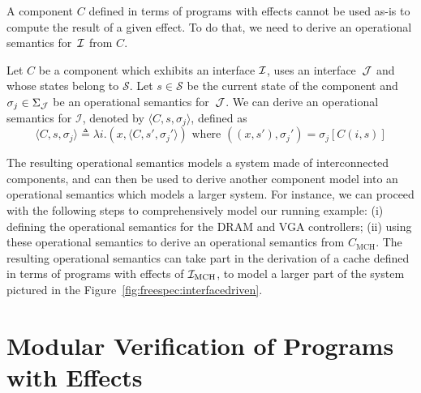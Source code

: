 A component $C$ defined in terms of programs with effects cannot be used as-is
to compute the result of a given effect.
%
To do that, we need to derive an operational semantics for~$\mathcal{I}$ from $C$.

\begin{definition} \label{def:freespec:derivation} Let $C$ be a component which
  exhibits an interface $\mathcal{I}$, uses an interface~$\mathcal{J}$ and whose states belong to
  $\mathcal{S}$.
  Let $s \in \mathcal{S}$ be the current state of the component and
  $\sigma_j \in \Sigma_{\mathcal{J}}$ be an operational semantics for~$\mathcal{J}$.
  We can derive an operational semantics for $\mathcal{I}$, denoted by
  $\langle C, s, \sigma_j \rangle$, defined as
  \[ \langle C, s, \sigma_j \rangle \triangleq \lambda i. (x, \langle C, s',
    \sigma_j' \rangle) \text{ where } ((x, s'), \sigma_j') = \sigma_j[C (i, s)]
  \]
\end{definition}


%
The resulting operational semantics models a system made of interconnected
components, and can then be used to derive another component model into an
operational semantics which models a larger system.
%
For instance, we can proceed with the following steps to comprehensively model
our running example: (i) defining the operational semantics for the DRAM and VGA
controllers; (ii) using these operational semantics to derive an operational
semantics from $C_{\mathrm{MCH}}$.
%
The resulting operational semantics can take part in the derivation of a cache
defined in terms of programs with effects of $\mathcal{I}_{\mathrm{MCH}}$, to model a
larger part of the system pictured in the
Figure~\ref{fig:freespec:interfacedriven}.

\section{Modular Verification of Programs with Effects}
\label{sec:freespec:verifying}

